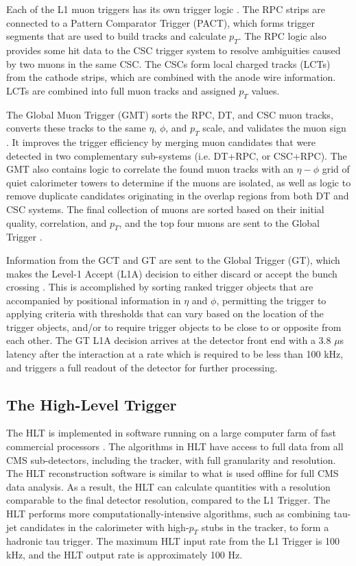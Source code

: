 Each of the L1 muon triggers has its own trigger logic \cite{CERN-LHCC-2000-038}. The RPC strips are connected to a Pattern Comparator Trigger (PACT), which forms trigger segments that are used to build tracks and calculate $p_{T}$. The RPC logic also provides some hit data to the CSC trigger system to resolve ambiguities caused by two muons in the same CSC. The CSCs form local charged tracks (LCTs) from the cathode strips, which are combined with the anode wire information. LCTs are combined into full muon tracks and assigned $p_{T}$ values. 

The Global Muon Trigger (GMT) sorts the RPC, DT, and CSC muon tracks, converts these tracks to the same $\eta$, $\phi$, and $p_{T}$ scale, and validates the muon sign \cite{CERN-LHCC-2000-038}. It improves the trigger efficiency by merging muon candidates that were detected in two complementary sub-systems (i.e. DT+RPC, or CSC+RPC). The GMT also contains logic to correlate the found muon tracks with an $\eta-\phi$ grid of quiet calorimeter towers to determine if the muons are isolated, as well as logic to remove duplicate candidates originating in the overlap regions from both DT and CSC systems. The final collection of muons are sorted based on their initial quality, correlation, and $p_{T}$, and the top four muons are sent to the Global Trigger \cite{CERN-LHCC-2000-038}. 

Information from the GCT and GT are sent to the Global Trigger (GT), which makes the Level-1 Accept (L1A) decision to either discard or accept the bunch crossing \cite{CERN-LHCC-2000-038}. This is accomplished by sorting ranked trigger objects that are accompanied by positional information in $\eta$ and $\phi$, permitting the trigger to applying criteria with thresholds that can vary based on the location of the trigger objects, and/or to require trigger objects to be close to or opposite from each other. The GT L1A decision arrives at the detector front end with a 3.8 $\mu$s latency after the interaction at a rate which is required to be less than 100 kHz, and triggers a full readout of the detector for further processing.



\subsection{The High-Level Trigger}
\label{section:phase-1-high-level-trigger}
The HLT is implemented in software running on a large computer farm of fast commercial processors \cite{CMS-TDR-022-HLT} \cite{Foudas:2008dt}. The algorithms in HLT have access to full data from all CMS sub-detectors, including the tracker, with full granularity and resolution. The HLT reconstruction software is similar to what is used offline for full CMS data analysis. As a result, the HLT can calculate quantities with a resolution comparable to the final detector resolution, compared to the L1 Trigger. The HLT performs more computationally-intensive algorithms, such as combining tau-jet candidates in the calorimeter with high-$p_T$ stubs in the tracker, to form a hadronic tau trigger. The maximum HLT input rate from the L1 Trigger is 100 kHz, and the HLT output rate is approximately 100 Hz. 

